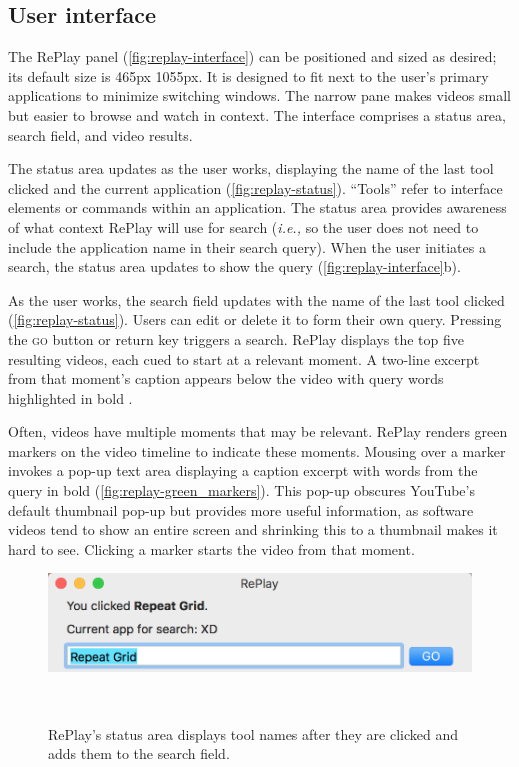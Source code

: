 \subsection{User interface}
The RePlay panel (\autoref{fig:replay-interface}) can be positioned and sized as desired; its default size is 465px \texttimes 1055px. It is designed to fit next to the user's primary applications to minimize switching windows. The narrow pane makes videos small but easier to browse and watch in context. The interface comprises a status area, search field, and video results.

The status area updates as the user works, displaying the name of the last tool clicked and the current application (\autoref{fig:replay-status}). ``Tools'' refer to interface elements or commands within an application. The status area provides awareness of what context RePlay will use for search (\textit{i.e.,} so the user does not need to include the application name in their search query). When the user initiates a search, the status area updates to show the query (\autoref{fig:replay-interface}b).

As the user works, the search field updates with the name of the last tool clicked (\autoref{fig:replay-status}). Users can edit or delete it to form their own query. Pressing the \textsc{go} button or return key triggers a search. RePlay displays the top five resulting videos, each cued to start at a relevant moment. A two-line excerpt from that moment's caption appears below the video with query words highlighted in bold \cite{Hearst2009Book}.

Often, videos have multiple moments that may be relevant. RePlay renders green markers on the video timeline to indicate these moments. Mousing over a marker invokes a pop-up text area displaying a caption excerpt with words from the query in bold (\autoref{fig:replay-green_markers}). This pop-up obscures YouTube's default thumbnail pop-up but provides more useful information, as software videos tend to show an entire screen and shrinking this to a thumbnail makes it hard to see. Clicking a marker starts the video from that moment. 

\begin{figure}[b!]
\centering
\vspace{-0.2in}
  \includegraphics[width=\textwidth]{replay/figures/replay_status.png}
  \caption{RePlay's status area displays tool names after they are clicked and adds them to the search field. }~\label{fig:replay-status}
  \vspace{-0.2in}
\end{figure}


